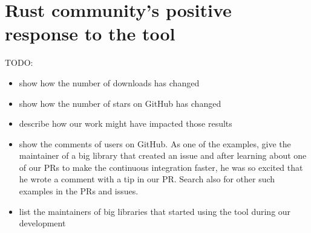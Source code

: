 \documentclass[licencjacka,en]{pracamgr}
\begin{document}
\section{Rust community's positive response to the tool}\label{r:section_community_response}

TODO:
\begin{itemize}
	\item show how the number of downloads has changed
	\item show how the number of stars on GitHub has changed
	\item describe how our work might have impacted those results
	\item show the comments of users on GitHub.
		As one of the examples, give the maintainer of a big
		library that created an issue 
		and after learning about one of our PRs to make the continuous integration faster,
		he was so excited that he wrote a comment with a tip in our PR.
		Search also for other such examples in the PRs and issues.
	\item list the maintainers of big libraries that started using the tool during our development
\end{itemize}


\appendix
\end{document}
